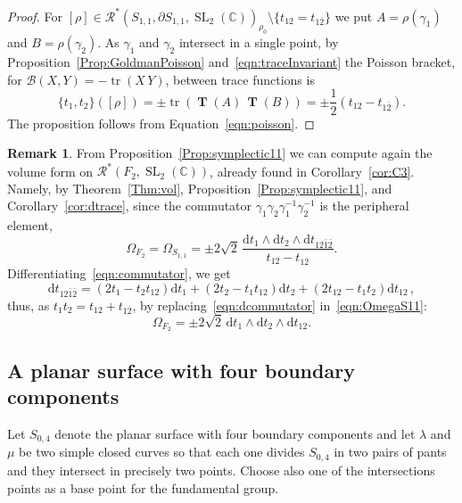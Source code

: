 \documentclass[11pt]{article}
\theoremstyle{definition}
\newtheorem{rema}[theo]{Remark}
\numberwithin{equation}{section}
\numberwithin{figure}{section}
\numberwithin{table}{section}
\DeclareMathOperator{\SL}{SL}
\DeclareMathOperator{\tr}{tr}
\newcommand{\Bcal}{\mathcal{B}}
\newcommand{\Rcal}{\mathcal{R}}
\newcommand{\Cbb}{\mathbb{C}}
\newcommand{\Tbf}{\mathbf{T}}
\newcommand*{\dd}{\mathrm{d}}
\begin{document}
\begin{proof}
For $[\rho]\in\Rcal^*(S_{1,1},\partial S_{1,1}, \SL_2(\Cbb))_{\rho_0}\setminus\{t_{12}= t_{1\bar 2}\}$ we put $A=\rho(\gamma_1)$ and $B=\rho(\gamma_2)$. As $\gamma_1$ and $\gamma_2$ intersect in a single point, by Proposition~\ref{Prop:GoldmanPoisson} and~\eqref{eqn:traceInvariant} the Poisson bracket, for $\Bcal(X,Y)= -\tr (X\, Y)$, between trace functions is
\[
\{t_1,t_2\}([\rho])=\pm \tr(\operatorname{\Tbf}(A)\, \operatorname{\Tbf}(B)) =\pm\frac12(t_{12}-t_{1\bar 2}).
\]
The proposition follows from Equation~\eqref{eqn:poisson}.
\end{proof}



\begin{rema}
From Proposition~\ref{Prop:symplectic11} we can compute again the volume form on $\Rcal^*(F_2,\SL_2(\Cbb))$, already found in Corollary~\ref{cor:C3}. Namely, by Theorem~\ref{Thm:vol}, Proposition~\ref{Prop:symplectic11}, and Corollary~\ref{cor:dtrace}, since the commutator $\gamma_1\gamma_2\gamma_1^{-1}\gamma_2^{-1}$ is the peripheral element,
\begin{equation}\label{eqn:OmegaS11}
\Omega_{F_2} =\Omega_{S_{1,1}} =\pm 2\sqrt{2}\,\frac{\dd t_1\wedge \dd t_2\wedge \dd t_{12\bar 1\bar 2}}{t_{12}-t_{1 \bar2}}.
\end{equation}
Differentiating~\eqref{eqn:commutator}, we get
\begin{equation}\label{eqn:dcommutator}
\dd t_{12\bar 1\bar2} = (2 t_1-t_2t_{12}) \dd t_1 + (2 t_2-t_1t_{12}) \dd t_2 + (2 t_{12}-t_1t_{2}) \dd t_{12}\,,
\end{equation}
thus, as $t_1t_2=t_{12}+t_{1\bar 2}$, by replacing~\eqref{eqn:dcommutator} in~\eqref{eqn:OmegaS11}:
\[
\Omega_{F_2} =\pm 2\sqrt{2}\, \dd t_1\wedge \dd t_2\wedge \dd t_{12}.
\]
\end{rema}



\subsection{A planar surface with four boundary components}\label{sec:S04}

Let $S_{0,4}$ denote the planar surface with four boundary components and let $\lambda$ and $\mu$ be two simple closed curves so that each one divides $S_{0,4}$ in two pairs of pants and they intersect in precisely two points. Choose also one of the intersections points as a base point for the fundamental group.
\end{document}
